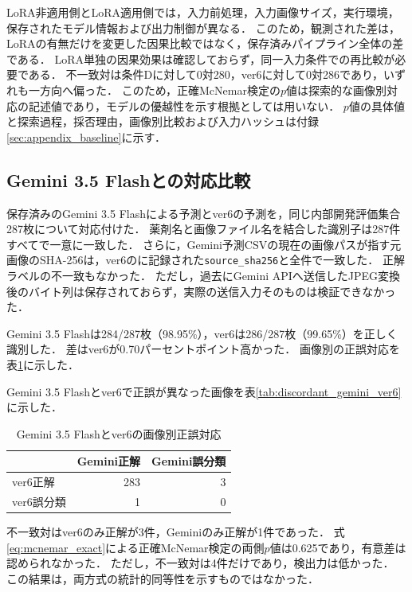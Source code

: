 \documentclass[uplatex,dvipdfmx]{jsarticle}
\begin{document}
LoRA非適用側とLoRA適用側では，入力前処理，入力画像サイズ，実行環境，保存されたモデル情報および出力制御が異なる．
このため，観測された差は，LoRAの有無だけを変更した因果比較ではなく，保存済みパイプライン全体の差である．
LoRA単独の因果効果は確認しておらず，同一入力条件での再比較が必要である．
不一致対は条件Dに対して0対280，ver6に対して0対286であり，いずれも一方向へ偏った．
このため，正確McNemar検定の$p$値は探索的な画像別対応の記述値であり，モデルの優越性を示す根拠としては用いない．
$p$値の具体値と探索過程，採否理由，画像別比較および入力ハッシュは付録\ref{sec:appendix_baseline}に示す．

\subsection{Gemini 3.5 Flashとの対応比較}\label{sec:gemini_compare}

保存済みのGemini 3.5 Flashによる予測とver6の予測を，同じ内部開発評価集合287枚について対応付けた．
薬剤名と画像ファイル名を結合した識別子は287件すべてで一意に一致した．
さらに，Gemini予測CSVの現在の画像パスが指す元画像のSHA-256は，ver6のに記録された\texttt{source\_sha256}と全件で一致した．
正解ラベルの不一致もなかった．
ただし，過去にGemini APIへ送信したJPEG変換後のバイト列は保存されておらず，実際の送信入力そのものは検証できなかった．

Gemini 3.5 Flashは284/287枚（98.95\%），ver6は286/287枚（99.65\%）を正しく識別した．
差はver6が0.70パーセントポイント高かった．
画像別の正誤対応を表\ref{tab:paired_gemini_ver6}に示した．

Gemini 3.5 Flashとver6で正誤が異なった画像を表\ref{tab:discordant_gemini_ver6}に示した．
\begin{table}[H]
  \centering
  \caption{Gemini 3.5 Flashとver6の画像別正誤対応}
  \label{tab:paired_gemini_ver6}
  \small
  \begin{tabular}{|l|r|r|}
    \hline
     & Gemini正解 & Gemini誤分類 \\ \hline
    ver6正解 & 283 & 3 \\ \hline
    ver6誤分類 & 1 & 0 \\ \hline
  \end{tabular}
\end{table}

不一致対はver6のみ正解が3件，Geminiのみ正解が1件であった．
式\eqref{eq:mcnemar_exact}による正確McNemar検定の両側$p$値は0.625であり，有意差は認められなかった．
ただし，不一致対は4件だけであり，検出力は低かった．
この結果は，両方式の統計的同等性を示すものではなかった．
\end{document}
